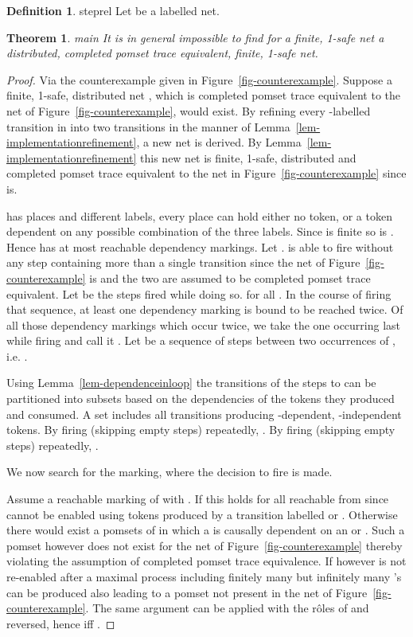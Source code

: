 \documentclass[submission,copyright,creativecommons]{eptcs}
\newtheorem{theorem}{Theorem}[section]
\theoremstyle{definition}
\newtheorem{definition}{Definition}
\def\lemmaname{Lemma}
\newcommand{\reflem}[1]{\lemmaname~\ref{lem-#1}}
\def\figurename{Figure}
\newcommand{\reffig}[1]{\figurename~\ref{fig-#1}}
\begin{document}
\begin{definition}{steprel}{
  Let  be a labelled net.
  }
\begin{theorem}{main}{}
  It is in general impossible to find for a finite, 1-safe net a
  distributed, completed pomset trace equivalent, finite, 1-safe net.
\end{theorem}
\begin{proof}
  Via the counterexample given in \reffig{counterexample}.
  Suppose a finite, 1-safe, distributed net , which is completed
  pomset trace equivalent to the net of \reffig{counterexample}, would exist.
  By refining every -labelled transition in  into two transitions
  in the manner of \reflem{implementationrefinement},
  a new net  is derived.
  By \reflem{implementationrefinement} this new net is finite, 1-safe, distributed and
  completed pomset trace equivalent to the net in \reffig{counterexample} since  is.

   has  places and  different labels,
  every place can hold either no token, or a token dependent on any possible combination
  of the three labels. Since  is finite so is .
  Hence  has at most  reachable dependency markings. Let .
   is able to fire  without any step containing more than a single transition
  since the net of \reffig{counterexample} is and the two are assumed to be completed
  pomset trace equivalent.
  Let  be the steps fired while doing so.  for all .
  In the course of firing that sequence, at least one dependency marking is bound to be reached twice.
  Of all those dependency markings which occur twice, we take the one occurring last while
  firing  and call it .
  Let  be a sequence of steps between two
  occurrences of , i.e.
  .

  Using \reflem{dependenceinloop} the transitions of the steps  to  can be partitioned into subsets  based
  on the dependencies of the tokens they produced and consumed.
  A set  includes all transitions producing
  -dependent, -independent tokens.
  By firing 
  (skipping empty steps) repeatedly, .
  By firing 
  (skipping empty steps) repeatedly, .

  We now search for the marking, where the decision to fire  is made.

  Assume a reachable marking  of  with . If  this holds for all  reachable from  since  cannot be enabled using
  tokens produced by a transition labelled  or .
  Otherwise there would exist a pomsets of  in which a  is causally dependent on an  or . Such a
  pomset however does not exist for the net of \reffig{counterexample} thereby violating the
  assumption of completed pomset trace equivalence. If however  is not re-enabled after  a maximal process including
  finitely many  but infinitely many 's can be produced also leading to a pomset not present
  in the net of \reffig{counterexample}.
  The same argument can be applied with the r\^oles of  and  reversed, hence
   iff .


\end{proof}
\end{definition}
\end{document}
